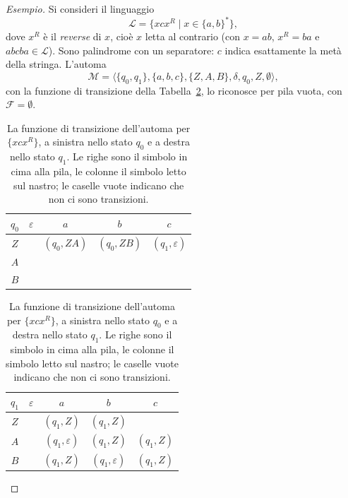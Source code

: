\documentclass[a4paper, 11pt, oneside]{book}
\theoremstyle{formale}
\newenvironment{esempio}
    {\begin{proof}[\textit{Esempio}]\renewcommand{\qedsymbol}{$\diamond$}}
    {\end{proof}}
\begin{document}
    \begin{esempio}
        Si consideri il linguaggio
        \begin{equation*}
            \mathcal{L} = \{x c x^R \mid x \in \{a, b\}^*\},
        \end{equation*}
        dove $x^R$ \`e il \emph{reverse} di $x$, cio\`e $x$ letta al contrario (con
        $x = ab$, $x^R = ba$ e $abcba \in \mathcal{L}$). Sono palindrome con un
        separatore: $c$ indica esattamente la met\`a della stringa. L'automa
        \begin{equation*}
            \mathcal{M} = \langle \{q_0, q_1\}, \{a, b, c\}, \{Z, A, B\}, \delta, q_0, Z,
            \emptyset \rangle,
        \end{equation*}
        con la funzione di transizione della Tabella~\ref{tab:pila-palindrome}, lo
        riconosce per pila vuota, con $\mathcal{F} = \emptyset$.

        \begin{table}[H]
            \centering
            \begin{tabular}{ccccc}
                \toprule
                $q_0$ & $\varepsilon$ & $a$ & $b$ & $c$ \\
                \midrule
                $Z$ & & $(q_0, ZA)$ & $(q_0, ZB)$ & $(q_1, \varepsilon)$ \\
                $A$ & & & & \\
                $B$ & & & & \\
                \bottomrule
            \end{tabular}
            \qquad
            \begin{tabular}{ccccc}
                \toprule
                $q_1$ & $\varepsilon$ & $a$ & $b$ & $c$ \\
                \midrule
                $Z$ & & $(q_1, Z)$ & $(q_1, Z)$ & \\
                $A$ & & $(q_1, \varepsilon)$ & $(q_1, Z)$ & $(q_1, Z)$ \\
                $B$ & & $(q_1, Z)$ & $(q_1, \varepsilon)$ & $(q_1, Z)$ \\
                \bottomrule
            \end{tabular}
            \caption{La funzione di transizione dell'automa per $\{x c x^R\}$, a sinistra
                nello stato $q_0$ e a destra nello stato $q_1$. Le righe sono il simbolo
                in cima alla pila, le colonne il simbolo letto sul nastro; le caselle vuote
                indicano che non ci sono transizioni.}
            \label{tab:pila-palindrome}
        \end{table}


\end{esempio}
\end{document}

